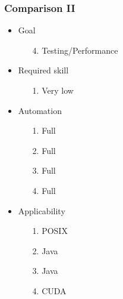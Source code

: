 \documentclass{beamer}
\begin{document}
	\begin{frame}
		\frametitle{Comparison II}
		
		\begin{itemize}
			\item Goal
			\begin{itemize}
				\color{Paper4Full}  \item[4.] Testing/Performance
			\end{itemize}
			\item Required skill
			\begin{itemize}
				\color{Paper1Full}  \item[1.] Very low
			\end{itemize}
			\item Automation
			\begin{itemize}
				\color{Paper1Full}  \item[1.] Full
				\color{Paper2Full}  \item[2.] Full
				\color{Paper3Full}  \item[3.] Full
				\color{Paper4Full}  \item[4.] Full
			\end{itemize}
			\item Applicability
			\begin{itemize}
				\color{Paper1Full}  \item[1.] POSIX
				\color{Paper2Full}  \item[2.] Java
				\color{Paper3Full}  \item[3.] Java
				\color{Paper4Full}  \item[4.] CUDA
			\end{itemize}
		\end{itemize}
	\end{frame}
	
\end{document}
